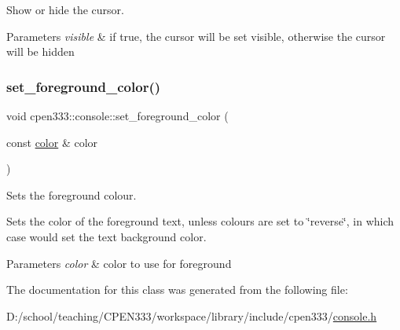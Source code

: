 Show or hide the cursor. 


\begin{DoxyParams}{Parameters}
{\em visible} & if {\ttfamily true}, the cursor will be set visible, otherwise the cursor will be hidden \\
\hline
\end{DoxyParams}
\mbox{\label{classcpen333_1_1console_a0710a0e8e75562c189bcf81837f01fa4}} 
\subsubsection{\texorpdfstring{set\+\_\+foreground\+\_\+color()}{set\_foreground\_color()}}
{\footnotesize\ttfamily void cpen333\+::console\+::set\+\_\+foreground\+\_\+color (\begin{DoxyParamCaption}\item[{const \hyperlink{console_8h_a915749711f4fc63cca8581af0c1106b3}{color} \&}]{color }\end{DoxyParamCaption})\hspace{0.3cm}{\ttfamily [inline]}}



Sets the foreground colour. 

Sets the color of the foreground text, unless colours are set to \char`\"{}reverse\char`\"{}, in which case would set the text background color.


\begin{DoxyParams}{Parameters}
{\em color} & color to use for foreground \\
\hline
\end{DoxyParams}


The documentation for this class was generated from the following file\+:\begin{DoxyCompactItemize}
\item 
D\+:/school/teaching/\+C\+P\+E\+N333/workspace/library/include/cpen333/\hyperlink{console_8h}{console.\+h}\end{DoxyCompactItemize}
